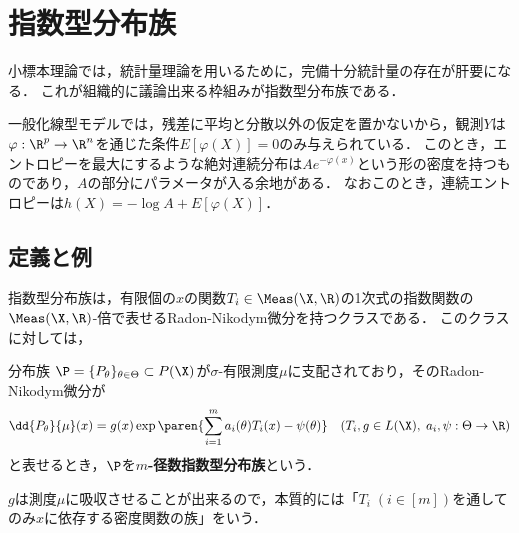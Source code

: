 \documentclass[uplatex,dvipdfmx]{jsreport}
\begin{document}
\section{指数型分布族}

\begin{tcolorbox}[colframe=ForestGreen, colback=ForestGreen!10!white,breakable,colbacktitle=ForestGreen!40!white,coltitle=black,fonttitle=\bfseries\sffamily,
title=]
    小標本理論では，統計量理論を用いるために，完備十分統計量の存在が肝要になる．
    これが組織的に議論出来る枠組みが指数型分布族である．
\end{tcolorbox}

\begin{remarks}[連続エントロピーを最大にする分布族としての特徴付け]
    一般化線型モデルでは，残差に平均と分散以外の仮定を置かないから，観測$Y$は$\varphi:\R^p\to\R^n$を通じた条件$E[\varphi(X)]=0$のみ与えられている．
    このとき，エントロピーを最大にするような絶対連続分布は$Ae^{-\varphi(x)}$という形の密度を持つものであり，$A$の部分にパラメータが入る余地がある．
    なおこのとき，連続エントロピーは$h(X)=-\log A+E[\varphi(X)]$．
\end{remarks}

\subsection{定義と例}

\begin{tcolorbox}[colframe=ForestGreen, colback=ForestGreen!10!white,breakable,colbacktitle=ForestGreen!40!white,coltitle=black,fonttitle=\bfseries\sffamily,
title=]
    指数型分布族は，有限個の$x$の関数$T_i\in\Meas(\X,\R)$の1次式の指数関数の$\Meas(\X,\R)$-倍で表せるRadon-Nikodym微分を持つクラスである．
    このクラスに対しては，
\end{tcolorbox}

\begin{definition}
    分布族
    $\P=\{P_\theta\}_{\theta\in\Theta}\subset P(\X)$が$\sigma$-有限測度$\mu$に支配されており，そのRadon-Nikodym微分が
    \[\dd{P_\theta}{\mu}(x)=g(x)\exp\paren{\sum^m_{i=1}a_i(\theta)T_i(x)-\psi(\theta)}\quad(T_i,g\in L(\X),\;a_i,\psi:\Theta\to\R)\]
    と表せるとき，$\P$を\textbf{$m$-径数指数型分布族}という．
\end{definition}
\begin{remarks}
    $g$は測度$\mu$に吸収させることが出来るので，本質的には「$T_i\;(i\in[m])$を通してのみ$x$に依存する密度関数の族」をいう．
\end{remarks}
\end{document}

